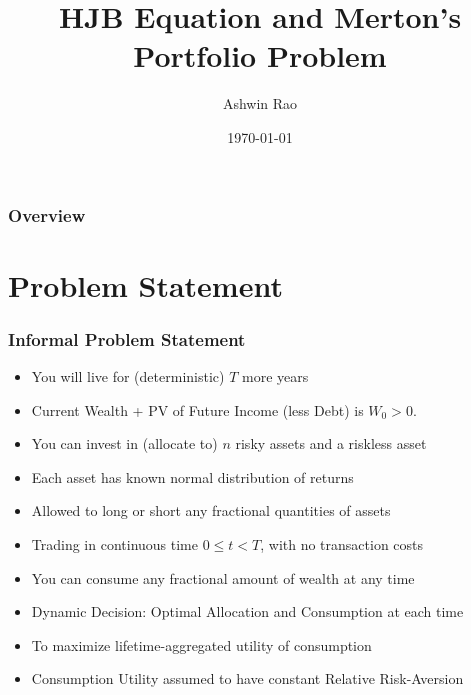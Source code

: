 \documentclass{beamer}
\title[HJB and Merton Portfolio]{HJB Equation and Merton's Portfolio Problem} %
\author{Ashwin Rao} %
\institute[] %
{
}
\date{\today} %
\begin{document}
\begin{frame}
\titlepage %
\end{frame}

\begin{frame}
\frametitle{Overview} %
\tableofcontents %
\end{frame}

\section{Problem Statement}

\begin{frame}
\frametitle{Informal Problem Statement}
\begin{itemize}
\item You will live for (deterministic) $T$ more years
\item Current Wealth + PV of Future Income (less Debt) is $W_0 > 0$.
\item You can invest in (allocate to) $n$ risky assets and a riskless asset
\item Each asset has known normal distribution of returns
\item Allowed to long or short any fractional quantities of assets
\item Trading in continuous time $0 \leq t < T$, with no transaction costs
\item You can consume any fractional amount of wealth at any time
\item Dynamic Decision: Optimal Allocation and Consumption at each time
\item To maximize lifetime-aggregated utility of consumption
\item Consumption Utility assumed to have constant Relative Risk-Aversion
\end{itemize}
\end{frame}
\end{document}
